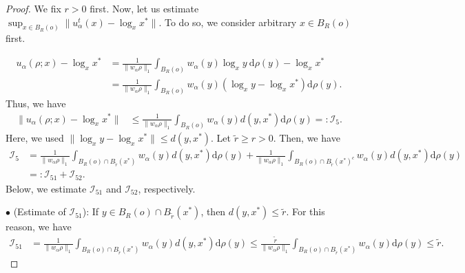 \documentclass[11pt]{amsart}
\def\d{\mathrm{d}}
\newcommand{\p}{o}%
\newcommand{\dist}{d}%
\begin{document}

\begin{proof}

We fix $r>0$ first. Now, let us estimate $\sup_{x\in B_R(\p)}\|u_\alpha^t(x)-\log_xx^*\|$. To do so, we consider arbitrary $x\in B_R(\p)$ first. 

\begin{align*}
u_\alpha(\rho;x)-\log_xx^* &=\frac{1}{\|w_\alpha\rho\|_1}\int_{B_R(\p)}w_\alpha(y)\log_xy~\d\rho(y)-\log_x x^*\\
&=\frac{1}{\|w_\alpha \rho\|_1}\int_{B_R(o)} w_\alpha(y) (\log_xy-\log_xx^*)\d \rho(y).
\end{align*}
Thus, we have
\begin{align*}
\|u_\alpha(\rho;x)-\log_xx^*\|&\leq\frac{1}{\|w_\alpha \rho\|_1}\int_{B_R(o)} w_\alpha(y) \dist(y, x^*)\d \rho(y)=:\mathcal{I}_5.
\end{align*}
Here, we used $\|\log_x y-\log_x x^*\|\leq \dist(y, x^*)$. Let $\tilde r\geq r>0$. Then, we have
\begin{align*}
\mathcal I_{5} & = \frac{1}{\|w_\alpha   \rho\|_1}\int_{B_R(\p)\cap B_{\tilde{r}}(x^*)}w_\alpha(y)  \dist(y, x^*)\d \rho(y)+ \frac{1}{\|w_\alpha   \rho\|_1}\int_{B_R(\p)\cap B_{\tilde{r}}(x^*)^c}w_\alpha(y) \dist(y, x^*)\d \rho(y) \\
& = :\mathcal I_{51} +\mathcal I_{52}.
\end{align*}
Below, we estimate $\mathcal I_{51}$ and $\mathcal I_{52}$, respectively. \newline

\noindent $\bullet$ (Estimate of $\mathcal I_{51}$): If $y\in B_R(\p)\cap B_{\tilde r}(x^*)$, then $\dist(y, x^*)\leq \tilde{r}$. For this reason, we have
\begin{align*}
\mathcal I_{51} & = \frac{1}{\|w_\alpha   \rho\|_1}\int_{B_R(\p)\cap B_{\tilde{r}}(x^*)}w_\alpha(y) \dist(y, x^*)\d \rho(y) \leq \frac{\tilde{r}}{\|w_\alpha   \rho\|_1}\int_{B_R(\p)\cap B_{\tilde{r}}(x^*)}w_\alpha(y) \d\rho(y) \leq \tilde r.
\end{align*}


\end{proof}
\end{document}
